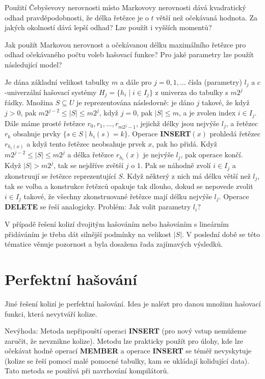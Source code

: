 \documentclass[a4paper,12pt]{article}
\begin{document}
Použití \v Cebyševovy nerovnosti místo 
Markovovy nerovnosti dává kvadratický odhad 
prav\-dě\-podobnosti, že délka řetězce je o $t$ větší než 
očekávaná hodnota. Za jakých okolností dává lepší 
odhad? Lze použít i vyšších momentů?

Jak použít Markovou nerovnost a očekávanou 
délku maximál\-ní\-ho řetězce pro odhad očeká\-va\-ného 
počtu voleb hašovací funk\-ce? 
Pro jaké parametry lze použít následující model?

Je dána základní velikost tabulky $m$ a dále pro $
j=0,1,\dots$ 
čísla (parametry) $l_j$ a $c$-univer\-zál\-ní hašovací systémy 
$H_j=\{h_i\mid i\in I_j\}$ z univerza do tabulky s $m2^j$ řádky.\newline 
Množina $S\subseteq U$ je reprezentována následovně:  je dáno $
j$ 
tako\-vé, že když $j>0$, pak $m2^{j-2}\le |S|\le m2^j$, když $
j=0$, pak 
$|S|\le m$, a je zvolen index $i\in I_j$.  Dále máme prosté řetězce 
$r_0,r_1,\dots,r_{m2^j-1}$, jejichž délky jsou nejvýše $
l_j$, a řetězec $r_k$ 
obsahuje prvky $\{s\in S\mid h_i(s)=k\}$.\newline 
Operace {\bf INSERT$(x)$} prohledá řetězec $r_{h_i(x)}$ a když tento 
ře\-tě\-zec neobsahuje prvek $x$, pak ho přidá.  Když 
$m2^{j-2}\le |S|\le m2^j$ a délka řetězce $r_{h_i}(x)$ je nejvýše $
l_j$, pak 
operace končí.  Když $|S|>m2^j$, tak se nejdříve zvětší $
j$ o $1$.  
Pak se náhodně zvolí $i\in I_j$ a zkonstruují se řetězce 
reprezentující $S$.  Když některý z nich má délku větší než $
l_j$, 
tak se volba a konstrukce řetězců opakuje tak dlouho, 
dokud se nepovede zvolit $i\in I_j$ takové, že všechny 
zkonstruované řetězce mají délku nejvýše $l_j$.  Operace {\bf DELETE }
se řeší analogicky.\newline 
Problém:  Jak volit parametry $l_i$?  

V případě řešení 
kolizí dvojitým hašováním nebo hašováním s 
lineárním přidáváním je třeba dát silnější podmínky na velikost $
|S|$. V poslední době se této tématice 
věnuje pozornost a byla dosažena řada zajímavých výsledků.

\section{Perfektní hašování}

Jiné řešení kolizí je perfektní hašování. Idea 
je nalézt pro danou množinu hašovací funkci, která 
nevytváří kolize.

Nevýhoda: Metoda nepřipouští operaci {\bf INSERT }
(pro nový vstup nemůžeme zaručit, že nevznikne  
kolize). Metodu lze prakticky použít pro úlohy, kde lze 
očekávat hodně operací {\bf MEMBER} a operace {\bf INSERT} se 
téměř nevyskytuje (kolize se řeší pomocí malé pomocné 
tabulky, kam se ukládají kolidují\-cí data). Tato metoda se 
používá při navrhování kompilátorů.
\end{document}
